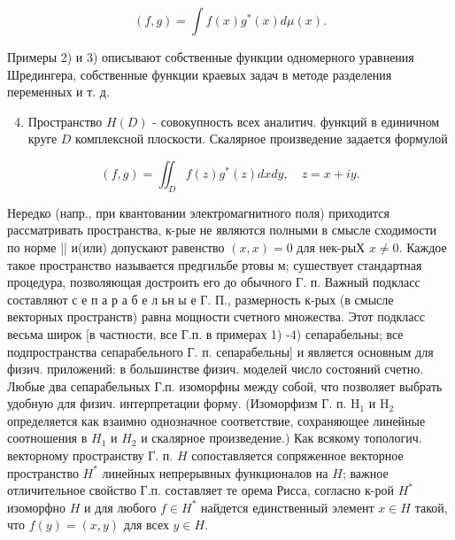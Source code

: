 \documentclass[10pt]{article}
\begin{document}
\[

(f, g)=\int f(x) g^{*}(x) d \mu(x) .

\]



Примеры 2) и 3) описывают собственные функции одномерного уравнения Шредингера, собственные функции краевых задач в методе разделения переменных и т. д.



\begin{enumerate}

  \setcounter{enumi}{3}

  \item Пространство $H(D)$ - совокупность всех аналитич. функций в единичном круге $D$ комплексной плоскости. Скалярное произведение задается формулой

\end{enumerate}



\[

(f, g)=\iint_{D} f(z) g^{*}(z) d x d y, \quad z=x+i y .

\]



Нередко (напр., при квантовании электромагнитного поля) приходится рассматривать пространства, к-рые не являются полными в смысле сходимости по норме || и(или) допускают равенство $(x, x)=0$ для нек-рыХ $x \neq 0$. Каждое такое пространство называется предгильбе ртовы м; сушествует стандартная процедура, позволяющая достроить его до обычного Г. п. Важный подкласс составляют с е п а р а б е л ьн ы е Г. П., размерность к-рых (в смысле векторных пространств) равна мощности счетного множества. Этот подкласс весьма широк [в частности, все Г.п. в примерах 1) -4) сепарабельны; все подпространства сепарабельного Г. п. сепарабельны] и является основным для физич. приложений: в большинстве физич. моделей число состояний счетно. Любые два сепарабельных Г.п. изоморфны между собой, что позволяет выбрать удобную для физич. интерпретации форму. (Изоморфизм Г. п. $\mathrm{H}_{1}$ и $\mathrm{H}_{2}$ определяется как взаимно однозначное соответствие, сохраняющее линейные соотношения в $H_{1}$ и $H_{2}$ и скалярное произведение.) Как всякому топологич. векторному пространству Г. п. $H$ сопоставляется сопряженное векторное пространство $H^{*}$ линейных непрерывных функционалов на $H$; важное отличительное свойство Г.п. составляет те орема Рисса, согласно к-рой $H^{*}$ изоморфно $H$ и для любого $f \in H^{*}$ найдется единственный элемент $x \in H$ такой, что $f(y)=(x, y)$ для всех $y \in H$.
\end{document}
